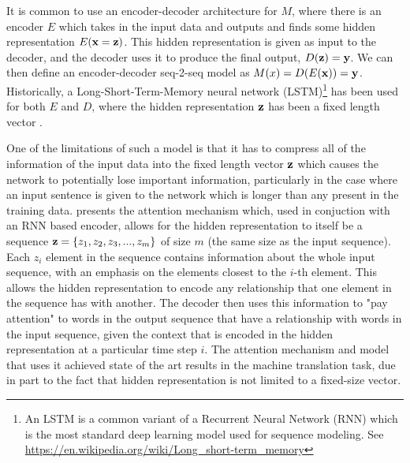 It is common to use an encoder-decoder architecture for $M$, where there is an encoder $E$ which takes in the input data and outputs and finds some hidden representation $E(\mathbf{x} = \mathbf{z})$. This hidden representation is given as input to the decoder, and the decoder uses it to produce the final output, $D(\mathbf{z}) = \mathbf{y}$. We can then define an encoder-decoder seq-2-seq model as $M(x) = D(E(\mathbf{x})) = \mathbf{y}$. Historically, a Long-Short-Term-Memory neural network (LSTM)\footnote{An LSTM is a common variant of a Recurrent Neural Network (RNN) which is the most standard deep learning model used for sequence modeling. See \url{https://en.wikipedia.org/wiki/Long_short-term_memory}} has been used for both $E$ and $D$, where the hidden representation $\mathbf{z}$ has been a fixed length vector . 

One of the limitations of such a model is that it has to compress all of the information of the input data into the fixed length vector $\mathbf{z}$ which causes the network to potentially lose important information, particularly in the case where an input sentence is given to the network which is longer than any present in the training data. \citet{bahdanau2014neural} presents the attention mechanism which, used in conjuction with an RNN based encoder, allows for the hidden representation to itself be a sequence $\mathbf{z} = \{z_1, z_2, z_3, ..., z_m\}$ of size $m$ (the same size as the input sequence).    Each $z_i$ element in the sequence contains information about the whole input sequence, with an emphasis on the elements closest to the $i$-th element. This allows the hidden representation to encode any relationship that one element in the sequence has with another. The decoder then uses this information to "pay attention" to words in the output sequence that have a relationship with words in the input sequence, given the context that is encoded in the hidden representation at a particular time step $i$. The attention mechanism and model that uses it achieved state of the art results in the machine translation task, due in part to the fact that hidden representation is not limited to a fixed-size vector. 


